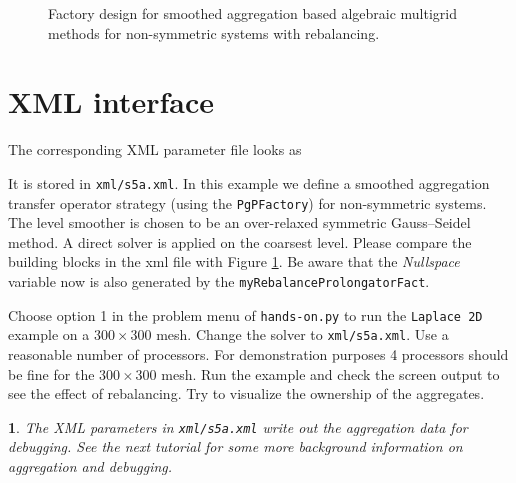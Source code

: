 \documentclass[10pt,fleqn]{book}
\newtheorem*{mycomment}{\ding{42}}
\begin{document}
\begin{figure}
\begin{center}
{
} %
\end{center}
\caption{Factory design for smoothed aggregation based algebraic multigrid methods for non-symmetric systems with rebalancing.}
\label{fig:rebalanceddesignpgamg}
\end{figure}

\section{XML interface}
The corresponding XML parameter file looks as



It is stored in \texttt{xml/s5a.xml}. In this example we define a smoothed aggregation transfer operator strategy (using the \verb|PgPFactory|) for non-symmetric systems. The level smoother is chosen to be an over-relaxed symmetric Gauss--Seidel method. A direct solver is applied on the coarsest level. Please compare the building blocks in the xml file with Figure \ref{fig:rebalanceddesignpgamg}. Be aware that the \textit{Nullspace} variable now is also generated by the \texttt{myRebalanceProlongatorFact}.

\begin{exercise}
Choose option 1 in the problem menu of \verb|hands-on.py| to run the \verb|Laplace 2D| example on a $300\times 300$ mesh.
Change the solver to \verb|xml/s5a.xml|.
Use a reasonable number of processors. For demonstration purposes 4 processors should be fine for the $300\times 300$ mesh.
Run the example and check the screen output to see the effect of rebalancing. Try to visualize the ownership of the aggregates.
\begin{mycomment}
The XML parameters in \verb|xml/s5a.xml| write out the aggregation data for debugging. See the next tutorial for some more background information on aggregation and debugging.
\end{mycomment}
\end{exercise}
\end{document}
